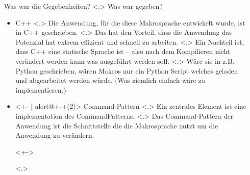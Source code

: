   \begin{frame}{Was war die Gegebenheiten?}
    \pause
        \note[item]<.>{
          Was war gegeben?
        }

    \begin{itemize}[<+- | alert@+>]
      \item
        C++
            \note[item]<.>{
              Die Anwendung, für die diese Makrosprache entwickelt wurde, ist in C++ geschrieben.
            }
            \note[item]<.>{
              Das hat den Vorteil, dass die Anwendung das Potenzial hat extrem effizient und schnell zu arbeiten.
            }
            \note[item]<.>{
              Ein Nachteil ist, dass C++ eine statische Sprache ist -- also nach dem Kompilieren nicht verändert werden kann was ausgeführt werden soll.
            }
            \note[item]<.>{
              Wäre sie in z.B. Python geschrieben, wären Makros nur ein Python Script welches geladen und abgearbeitet werden würde. (Was ziemlich einfach wäre zu implementieren.)
            }
      \item<+- | alert@+-+(2)>
        Command-Pattern%
            \note[item]<.>{
              Ein zentrales Element ist eine implementation des CommandPatterns.
            }
            \note[item]<.>{
              Das Command-Pattern der Anwendung ist die Schnittstelle die die Makrosprache nutzt um die Anwendung zu verändern.
            }
        \begin{uncoverenv}<+->%
          \begin{uncoverenv}<.>%
\end{uncoverenv}
\end{uncoverenv}
\end{itemize}
\end{frame}
